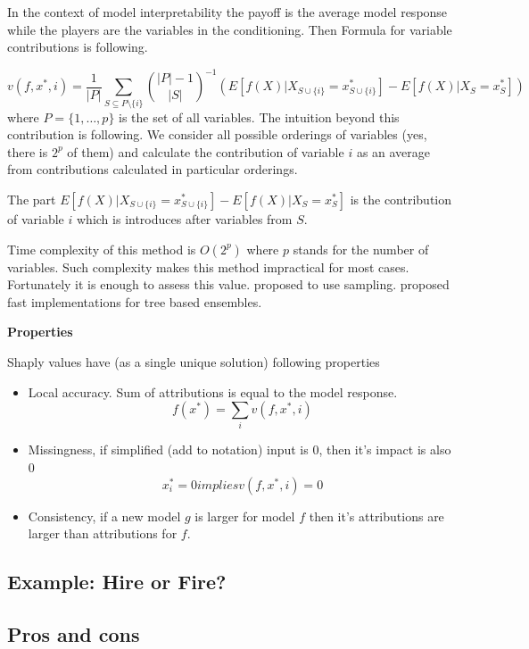 \documentclass[]{krantz}
\providecommand{\tightlist}{%
  \setlength{\itemsep}{0pt}\setlength{\parskip}{0pt}}
\theoremstyle{definition}
\theoremstyle{definition}
\theoremstyle{definition}
\theoremstyle{remark}
\begin{document}
In the context of model interpretability the payoff is the average model
response while the players are the variables in the conditioning. Then
Formula for variable contributions is following.

\[
v(f, x^*, i) = \frac 1{|P|}\sum_{S \subseteq P\setminus \{i\}}  {{|P|-1}\choose{|S|}}^{-1} \left(E [f(X) | X_{S \cup \{i\}} = x^*_{S \cup \{i\}}] - E [f(X) | X_{S} = x^*_{S}]\right)
\] where \(P = \{1, \ldots, p\}\) is the set of all variables. The
intuition beyond this contribution is following. We consider all
possible orderings of variables (yes, there is \(2^p\) of them) and
calculate the contribution of variable \(i\) as an average from
contributions calculated in particular orderings.

The part
\(E[f(X) | X_{S \cup \{i\}} = x^*_{S \cup \{i\}}] - E [f(X) | X_{S} = x^*_{S}]\)
is the contribution of variable \(i\) which is introduces after
variables from \(S\).

Time complexity of this method is \(O(2^p)\) where \(p\) stands for the
number of variables. Such complexity makes this method impractical for
most cases. Fortunately it is enough to assess this value.
\citep{Strumbelj2014} proposed to use sampling. \citep{TreeSHAP}
proposed fast implementations for tree based ensembles.

\textbf{Properties}

Shaply values have (as a single unique solution) following properties

\begin{itemize}
\tightlist
\item
  Local accuracy. Sum of attributions is equal to the model response. \[
  f(x^*) = \sum_{i}   v(f, x^*, i) 
  \]
\item
  Missingness, if simplified (add to notation) input is 0, then it's
  impact is also 0 \[
  x_i^* = 0 implies   v(f, x^*, i) = 0
  \]
\item
  Consistency, if a new model \(g\) is larger for model \(f\) then it's
  attributions are larger than attributions for \(f\).
\end{itemize}

\hypertarget{example-hire-or-fire-2}{%
\subsection{Example: Hire or Fire?}\label{example-hire-or-fire-2}}

\hypertarget{pros-and-cons-3}{%
\subsection{Pros and cons}\label{pros-and-cons-3}}
\end{document}

